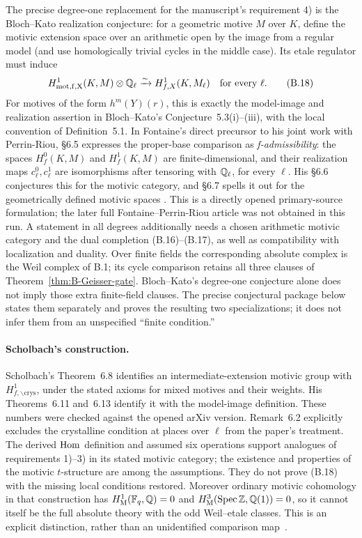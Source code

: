 The precise degree-one replacement for the manuscript's requirement
4) is the Bloch--Kato realization conjecture: for a geometric motive
\(M\) over \(K\), define the motivic extension space over an
arithmetic open by the image from a regular model (and use
homologically trivial cycles in the middle case).  Its etale regulator
must induce
\[
 H^1_{\rm mot,f,X}(K,M)\otimes\mathbb Q_\ell
 \xrightarrow{\sim}H^1_{f,X}(K,M_\ell)\quad\text{for every }\ell.
 \tag{B.18}
\]
For motives of the form \(h^m(Y)(r)\), this is exactly the
model-image and realization assertion in Bloch--Kato's
Conjecture~5.3(i)--(iii), with the local convention of Definition~5.1.
In Fontaine's direct precursor to his joint work with Perrin-Riou,
\S6.5 expresses the proper-base comparison as \emph{f-admissibility}:
the spaces \(H_f^0(K,M)\) and \(H_f^1(K,M)\) are finite-dimensional,
and their realization maps \(c^0_\ell,c^1_\ell\) are isomorphisms
after tensoring with \(\mathbb Q_\ell\), for every \(\ell\).
His \S6.6 conjectures this for the motivic category, and \S6.7
spells it out for the geometrically defined motivic spaces
\cite[pp.~221--223]{BFontaine1992}.  This is a directly opened
primary-source formulation; the later full Fontaine--Perrin-Riou
article was not obtained in this run.
A statement in all degrees additionally needs a chosen arithmetic
motivic category and the dual completion (B.16)--(B.17), as well as
compatibility with localization and duality.  Over finite fields the
corresponding absolute complex is the Weil complex of B.1; its cycle
comparison retains all three clauses of Theorem~\ref{thm:B-Geisser-gate}.
Bloch--Kato's degree-one conjecture alone does not imply those extra
finite-field clauses.  The precise conjectural package below states
them separately and proves the resulting two specializations;
it does not infer them from an unspecified ``finite condition.''

\paragraph{Scholbach's construction.}
Scholbach's Theorem~6.8 identifies an intermediate-extension motivic
group with \(H^1_{f,\backslash\mathrm{crys}}\), under the stated
axioms for mixed motives and their weights.  His Theorems~6.11 and~6.13
identify it with the model-image definition.  These numbers were
checked against the opened arXiv version.  Remark~6.2 explicitly
excludes the crystalline condition at places over \(\ell\) from the
paper's treatment.  The derived \(\operatorname{Hom}\) definition and assumed six
operations support analogues of requirements 1)--3) in its stated
motivic category; the existence and properties of the motivic
\(t\)-structure are among the assumptions.  They do not prove (B.18)
with the missing local conditions restored.  Moreover ordinary
motivic cohomology in that construction has
\(H^1_{\mathrm M}(\mathbb F_q,\mathbb Q)=0\) and
\(H^3_{\mathrm M}(\operatorname{Spec}\mathbb Z,\mathbb Q(1))=0\), so it cannot itself be the
full absolute theory with the odd Weil--etale classes.  This is an
explicit distinction, rather than an unidentified comparison
map~\cite[Remark~6.2 and Theorems~6.8, 6.11, 6.13]{BScholbach2015}.

